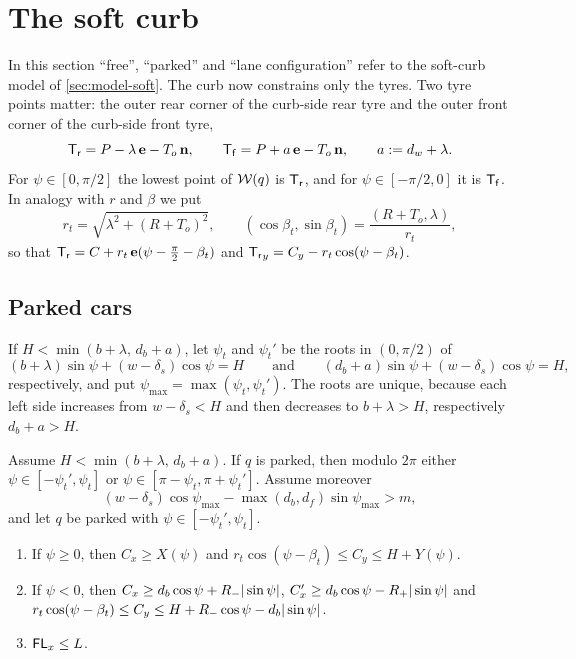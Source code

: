 \section{The soft curb}\label{sec:soft}

In this section ``free'', ``parked'' and ``lane configuration'' refer to the soft-curb model of \cref{sec:model-soft}.
The curb now constrains only the tyres.
Two tyre points matter: the outer rear corner of the curb-side rear tyre and the outer front corner of the curb-side front tyre,
\[
  \mathsf{T_r}=P-\lambda\,\mathbf{e}-T_o\,\mathbf{n},\qquad \mathsf{T_f}=P+a\,\mathbf{e}-T_o\,\mathbf{n},\qquad a:=d_w+\lambda .
\]
For $\psi\in[0,\pi/2]$ the lowest point of $\mathcal{W}(q)$ is $\mathsf{T_r}$, and for $\psi\in[-\pi/2,0]$ it is $\mathsf{T_f}$.
In analogy with $r$ and $\beta$ we put
\[
  r_t=\sqrt{\lambda^2+(R+T_o)^2},\qquad (\cos\beta_t,\sin\beta_t)=\frac{(R+T_o,\lambda)}{r_t},
\]
so that $\mathsf{T_r}=C+r_t\,\mathbf{e}(\psi-\tfrac\pi2-\beta_t)$ and $\mathsf{T_r}_y=C_y-r_t\cos(\psi-\beta_t)$.

\subsection{Parked cars}
If $H<\min(b+\lambda,\,d_b+a)$, let $\psi_t$ and $\psi_t'$ be the roots in $(0,\pi/2)$ of
\[
  (b+\lambda)\sin\psi+(w-\delta_s)\cos\psi=H\qquad\text{and}\qquad(d_b+a)\sin\psi+(w-\delta_s)\cos\psi=H ,
\]
respectively, and put $\psi_{\max}=\max(\psi_t,\psi_t')$.
The roots are unique, because each left side increases from $w-\delta_s<H$ and then decreases to $b+\lambda>H$, respectively $d_b+a>H$.

\begin{lemma}\label{lem:soft-fit}
Assume $H<\min(b+\lambda,\,d_b+a)$.
If $q$ is parked, then modulo $2\pi$ either $\psi\in[-\psi_t',\psi_t]$ or $\psi\in[\pi-\psi_t,\pi+\psi_t']$.
Assume moreover
\begin{equation}\label{eq:soft-band}
  (w-\delta_s)\cos\psi_{\max}-\max(d_b,d_f)\sin\psi_{\max}>m ,
\end{equation}
and let $q$ be parked with $\psi\in[-\psi_t',\psi_t]$.
\begin{enumerate}[label=(\alph*)]
\item If $\psi\ge0$, then $C_x\ge X(\psi)$ and $r_t\cos(\psi-\beta_t)\le C_y\le H+Y(\psi)$.
\item If $\psi<0$, then $C_x\ge d_b\cos\psi+R_{-}|\sin\psi|$, $C'_x\ge d_b\cos\psi-R_{+}|\sin\psi|$ and $r_t\cos(\psi-\beta_t)\le C_y\le H+R_{-}\cos\psi-d_b|\sin\psi|$.
\item $\mathsf{FL}_x\le L$.
\end{enumerate}
\end{lemma}

